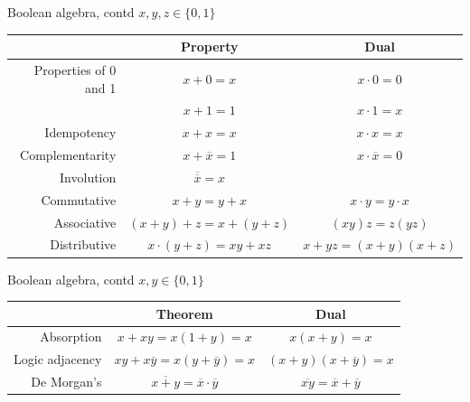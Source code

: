 \documentclass[presentation,aspectratio=1610]{beamer}
\renewcommand*{\not}[1]{\ensuremath{\bar{#1}}}
\renewcommand*{\not}[1]{\ensuremath{\overline{#1}}}
\begin{document}
\begin{frame}[label={sec:org2d0b9ef}]{Boolean algebra, contd}
\(x, y, z \in \{0,1\}\)

\begin{center}
\begin{tabular}{r|c|c|}
 & Property & Dual\\
\hline
Properties of 0 and 1 & \(x+0=x\) & \(x\cdot 0=0\)\\
 & \(x+1=1\) & \(x \cdot 1 = x\)\\
Idempotency & \(x+x=x\) & \(x\cdot x = x\)\\
Complementarity & \(x+\not{x}=1\) & \(x\cdot \not{x}=0\)\\
Involution & \(\not{\not{x}}=x\) & \\
Commutative & \(x+y=y+x\) & \(x\cdot y = y\cdot x\)\\
Associative & \((x+y) + z = x + (y+z)\) & \((xy)z = z(yz)\)\\
Distributive & \(x\cdot (y+z) = xy + xz\) & \(x+yz=(x+y)(x+z)\)\\
\hline
\end{tabular}
\end{center}
\end{frame}

\begin{frame}[label={sec:orge5065a4}]{Boolean algebra, contd}
\(x, y \in \{0,1\}\)

\begin{center}
\begin{tabular}{r|c|c|}
 & Theorem & Dual\\
\hline
Absorption & \(x+xy=x(1+y)=x\) & \(x(x+y)=x\)\\
Logic adjacency & \(xy + x\not{y} = x(y+\not{y}) =x\) & \((x+y)(x+\not{y}) = x\)\\
De Morgan's & \(\not{x+y}=\not{x}\cdot{}\not{y}\) & \(\not{xy} = \not{x} + \not{y}\)\\
\hline
\end{tabular}
\end{center}
\end{frame}
\end{document}
